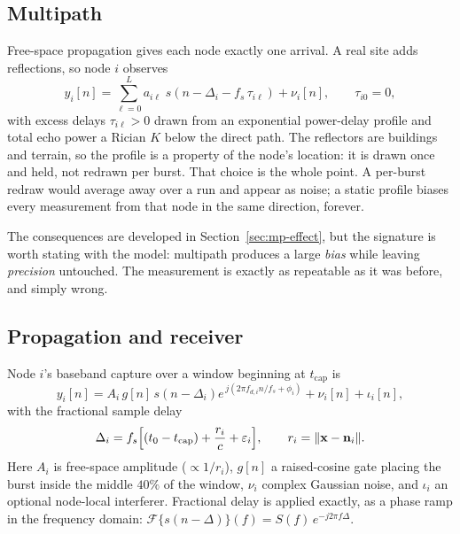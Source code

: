 \documentclass[11pt,a4paper]{article}
\begin{document}
\subsection{Multipath}
\label{sec:multipath}

Free-space propagation gives each node exactly one arrival. A real site
adds reflections, so node $i$ observes
\begin{equation}
  y_i[n] = \sum_{\ell=0}^{L} a_{i\ell}\; s\!\left(n - \Delta_i
           - f_s\,\tau_{i\ell}\right) + \nu_i[n],
  \qquad \tau_{i0}=0,
\end{equation}
with excess delays $\tau_{i\ell}>0$ drawn from an exponential power-delay
profile and total echo power a Rician $K$ below the direct path. The
reflectors are buildings and terrain, so the profile is a property of the
node's location: it is drawn once and held, not redrawn per burst. That
choice is the whole point. A per-burst redraw would average away over a
run and appear as noise; a static profile biases every measurement from
that node in the same direction, forever.

The consequences are developed in Section~\ref{sec:mp-effect}, but the
signature is worth stating with the model: multipath produces a large
\emph{bias} while leaving \emph{precision} untouched. The measurement is
exactly as repeatable as it was before, and simply wrong.

\subsection{Propagation and receiver}

Node $i$'s baseband capture over a window beginning at $t_{\text{cap}}$ is
\begin{equation}
  y_i[n] = A_i\, g[n]\, s\!\left(n - \Delta_i\right)
           e^{\,j(2\pi f_{d,i} n/f_s + \phi_i)} + \nu_i[n] + \iota_i[n],
  \label{eq:rx}
\end{equation}
with the fractional sample delay
\begin{equation}
  \Delta_i = f_s\Bigl[(t_0-t_{\text{cap}}) + \frac{r_i}{c} + \varepsilon_i\Bigr],
  \qquad r_i=\lVert\mathbf{x}-\mathbf{n}_i\rVert .
  \label{eq:delay}
\end{equation}
Here $A_i$ is free-space amplitude ($\propto 1/r_i$), $g[n]$ a raised-cosine
gate placing the burst inside the middle $40\%$ of the window, $\nu_i$
complex Gaussian noise, and $\iota_i$ an optional node-local interferer.
Fractional delay is applied exactly, as a phase ramp in the frequency
domain:
$\mathcal{F}\{s(n-\Delta)\}(f) = S(f)\,e^{-j2\pi f\Delta}$.
\end{document}
